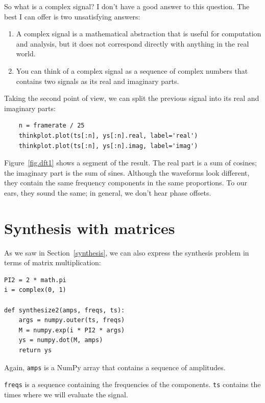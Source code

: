 \documentclass[12pt]{book}
\begin{document}
So what is a complex signal?  I don't have a good answer to this
question.  The best I can offer is two unsatisfying
answers:

\begin{enumerate}

\item A complex signal is a mathematical abstraction that is
useful for computation and analysis, but it does not correspond
directly with anything in the real world.

\item You can think of a complex signal as a sequence of complex
numbers that contains two signals as its real and imaginary parts.

\end{enumerate}

Taking the second point of view, we can split the previous
signal into its real and imaginary parts:

\begin{verbatim}
    n = framerate / 25
    thinkplot.plot(ts[:n], ys[:n].real, label='real')
    thinkplot.plot(ts[:n], ys[:n].imag, label='imag')
\end{verbatim}

Figure~\ref{fig.dft1} shows a segment of the result.  The
real part is a sum of cosines; the imaginary part is
the sum of sines.  Although the waveforms look different, they
contain the same frequency components in the same proportions.
To our ears, they sound the same; in general, we don't hear
phase offsets.


\section{Synthesis with matrices}
\label{synthmat}

As we saw in Section~\ref{synthesis}, we can also express the synthesis
problem in terms of matrix multiplication: 

\begin{verbatim}
PI2 = 2 * math.pi
i = complex(0, 1)

def synthesize2(amps, freqs, ts):
    args = numpy.outer(ts, freqs)
    M = numpy.exp(i * PI2 * args)
    ys = numpy.dot(M, amps)
    return ys
\end{verbatim}

Again, {\tt amps} is a NumPy array that contains a sequence of
amplitudes.

{\tt freqs} is a sequence containing the frequencies of the
components.  {\tt ts} contains the times where we will evaluate
the signal.
\end{document}
